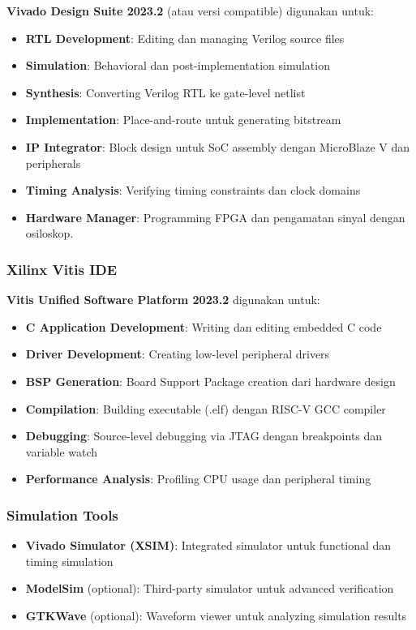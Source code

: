 \textbf{Vivado Design Suite 2023.2} (atau versi compatible) digunakan untuk:
\begin{itemize}
	\item \textbf{RTL Development}: Editing dan managing Verilog source files
	\item \textbf{Simulation}: Behavioral dan post-implementation simulation
	\item \textbf{Synthesis}: Converting Verilog RTL ke gate-level netlist
	\item \textbf{Implementation}: Place-and-route untuk generating bitstream
	\item \textbf{IP Integrator}: Block design untuk SoC assembly dengan MicroBlaze V dan peripherals
	\item \textbf{Timing Analysis}: Verifying timing constraints dan clock domains
	\item \textbf{Hardware Manager}: Programming FPGA dan pengamatan sinyal dengan osiloskop.
\end{itemize}

\subsubsection{Xilinx Vitis IDE}

\textbf{Vitis Unified Software Platform 2023.2} digunakan untuk:
\begin{itemize}
	\item \textbf{C Application Development}: Writing dan editing embedded C code
	\item \textbf{Driver Development}: Creating low-level peripheral drivers
	\item \textbf{BSP Generation}: Board Support Package creation dari hardware design
	\item \textbf{Compilation}: Building executable (.elf) dengan RISC-V GCC compiler
	\item \textbf{Debugging}: Source-level debugging via JTAG dengan breakpoints dan variable watch
	\item \textbf{Performance Analysis}: Profiling CPU usage dan peripheral timing
\end{itemize}

\subsubsection{Simulation Tools}

\begin{itemize}
	\item \textbf{Vivado Simulator (XSIM)}: Integrated simulator untuk functional dan timing simulation
	\item \textbf{ModelSim} (optional): Third-party simulator untuk advanced verification
	\item \textbf{GTKWave} (optional): Waveform viewer untuk analyzing simulation results
\end{itemize}

